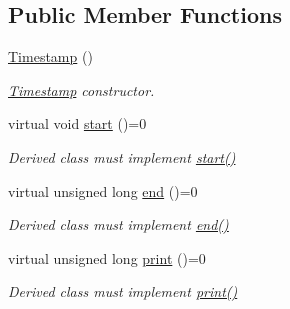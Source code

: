 \subsection*{Public Member Functions}
\begin{DoxyCompactItemize}
\item 
\hyperlink{class_timestamp_a2e610487ef16d9d5a8d6dc8ad457a3e7}{Timestamp} ()\hypertarget{class_timestamp_a2e610487ef16d9d5a8d6dc8ad457a3e7}{}\label{class_timestamp_a2e610487ef16d9d5a8d6dc8ad457a3e7}

\begin{DoxyCompactList}\small\item\em \hyperlink{class_timestamp}{Timestamp} constructor. \end{DoxyCompactList}\item 
virtual void \hyperlink{class_timestamp_a4aa0acbd36d3e022b3e7e43bc4d9b5db}{start} ()=0\hypertarget{class_timestamp_a4aa0acbd36d3e022b3e7e43bc4d9b5db}{}\label{class_timestamp_a4aa0acbd36d3e022b3e7e43bc4d9b5db}

\begin{DoxyCompactList}\small\item\em Derived class must implement \hyperlink{class_timestamp_a4aa0acbd36d3e022b3e7e43bc4d9b5db}{start()} \end{DoxyCompactList}\item 
virtual unsigned long \hyperlink{class_timestamp_a47e8cbc581a8af32201e7b1088733043}{end} ()=0\hypertarget{class_timestamp_a47e8cbc581a8af32201e7b1088733043}{}\label{class_timestamp_a47e8cbc581a8af32201e7b1088733043}

\begin{DoxyCompactList}\small\item\em Derived class must implement \hyperlink{class_timestamp_a47e8cbc581a8af32201e7b1088733043}{end()} \end{DoxyCompactList}\item 
virtual unsigned long \hyperlink{class_timestamp_a351537b95385937a004ab32b6b3743f7}{print} ()=0\hypertarget{class_timestamp_a351537b95385937a004ab32b6b3743f7}{}\label{class_timestamp_a351537b95385937a004ab32b6b3743f7}

\begin{DoxyCompactList}\small\item\em Derived class must implement \hyperlink{class_timestamp_a351537b95385937a004ab32b6b3743f7}{print()} \end{DoxyCompactList}\end{DoxyCompactItemize}
